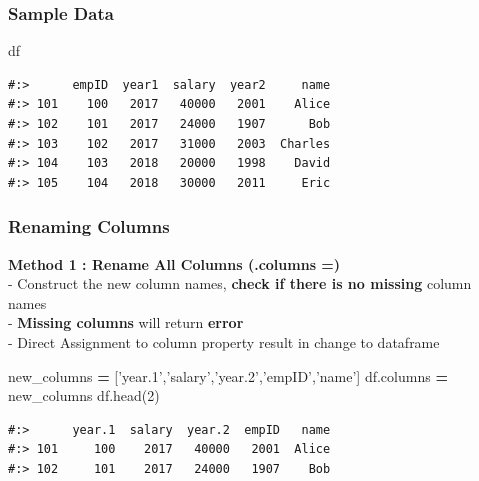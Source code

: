 \documentclass[
]{book}
\newenvironment{Shaded}{\begin{snugshade}}{\end{snugshade}}
\newcommand{\DecValTok}[1]{\textcolor[rgb]{0.06,0.06,0.06}{#1}}
\newcommand{\NormalTok}[1]{#1}
\newcommand{\OperatorTok}[1]{\textcolor[rgb]{0.43,0.43,0.43}{\textbf{#1}}}
\newcommand{\StringTok}[1]{\textcolor[rgb]{0.5,0.5,0.5}{#1}}
\begin{document}
\hypertarget{sample-data-7}{%
\subsubsection{Sample Data}\label{sample-data-7}}

\begin{Shaded}
\begin{Highlighting}[]
\NormalTok{df}
\end{Highlighting}
\end{Shaded}

\begin{verbatim}
#:>      empID  year1  salary  year2     name
#:> 101    100   2017   40000   2001    Alice
#:> 102    101   2017   24000   1907      Bob
#:> 103    102   2017   31000   2003  Charles
#:> 104    103   2018   20000   1998    David
#:> 105    104   2018   30000   2011     Eric
\end{verbatim}

\hypertarget{renaming-columns}{%
\subsubsection{Renaming Columns}\label{renaming-columns}}

\textbf{Method 1 : Rename All Columns (.columns =)}\\
- Construct the new column names, \textbf{check if there is no missing} column names\\
- \textbf{Missing columns} will return \textbf{error}\\
- Direct Assignment to column property result in change to dataframe

\begin{Shaded}
\begin{Highlighting}[]
\NormalTok{new_columns }\OperatorTok{=}\NormalTok{ [}\StringTok{'year.1'}\NormalTok{,}\StringTok{'salary'}\NormalTok{,}\StringTok{'year.2'}\NormalTok{,}\StringTok{'empID'}\NormalTok{,}\StringTok{'name'}\NormalTok{]}
\NormalTok{df.columns }\OperatorTok{=}\NormalTok{ new_columns}
\NormalTok{df.head(}\DecValTok{2}\NormalTok{)}
\end{Highlighting}
\end{Shaded}

\begin{verbatim}
#:>      year.1  salary  year.2  empID   name
#:> 101     100    2017   40000   2001  Alice
#:> 102     101    2017   24000   1907    Bob
\end{verbatim}
\end{document}
